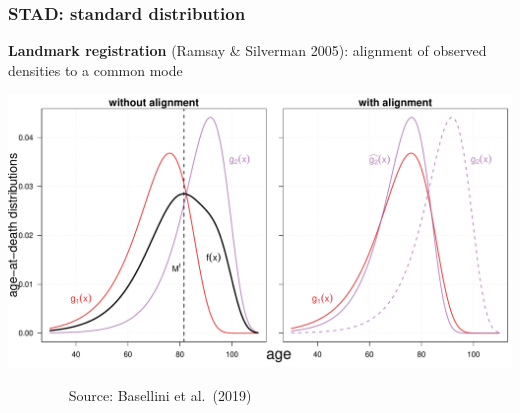 \documentclass[12pt, xcolor=table]{beamer}  %
\begin{document}
\begin{frame}[noframenumbering]\frametitle{STAD: standard distribution}

\vspace{-0.3cm}
	
	\begin{center}
		
		\textbf{Landmark registration} {\scriptsize (Ramsay \& Silverman 2005)}: alignment of observed densities to a common mode
		
		\vspace{0.3cm}
		
		\includegraphics[scale=.35]{Figures/Ch2/F8_3.pdf}
		
	\end{center}
	
\vspace{-0.15cm}
\scriptsize{$\quad\quad\quad\quad$ Source: Basellini et al.~(2019)}

	
\end{frame}	
\end{document}
